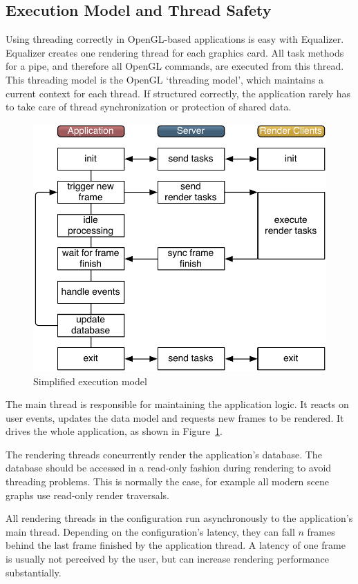 \documentclass[10pt,a4]{scrartcl}
\newcommand{\fig}[1]{Figure~\ref{#1}}
\begin{document}
\subsection{\label{sExecution}Execution Model and Thread Safety}

Using threading correctly in OpenGL-based applications is easy with
Equalizer. Equalizer creates one rendering thread for each graphics
card. All task methods for a pipe, and therefore all OpenGL commands,
are executed from this thread. This threading model is the OpenGL
`threading model', which maintains a current context for each
thread. If structured correctly, the application rarely has to take care
of thread synchronization or protection of shared data.

\begin{figure}
  \includegraphics[width=.618\textwidth]{images/model.pdf}
  {\caption{\label{fModel}Simplified execution model}}
\end{figure}
The main thread is responsible for maintaining the application logic. It
reacts on user events, updates the data model and requests new frames to
be rendered. It drives the whole application, as shown in \fig{fModel}.

The rendering threads concurrently render the application's
database. The data\-base should be accessed in a read-only fashion
during rendering to avoid threading problems. This is normally the case,
for example all modern scene graphs use read-only render traversals.

All rendering threads in the configuration run asynchronously to the
application's main thread. Depending on the configuration's latency,
they can fall $n$ frames behind the last frame finished by the
application thread. A latency of one frame is usually not perceived by
the user, but can increase rendering performance substantially.
\end{document}
